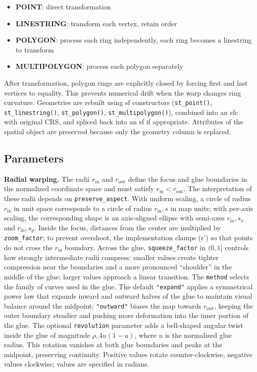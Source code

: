 \begin{itemize}
\tightlist
\item
  \textbf{POINT}: direct transformation
\item
  \textbf{LINESTRING}: transform each vertex, retain order
\item
  \textbf{POLYGON}: process each ring independently, each ring becomes a linestring to transform
\item
  \textbf{MULTIPOLYGON}: process each polygon separately
\end{itemize}

After transformation, polygon rings are explicitly closed by forcing first and last vertices to equality. This prevents numerical drift when the warp changes ring curvature. Geometries are rebuilt using sf constructors (\texttt{st\_point()}, \texttt{st\_linestring()}, \texttt{st\_polygon()}, \texttt{st\_multipolygon()}), combined into an sfc with original CRS, and spliced back into an sf if appropriate. Attributes of the spatial object are preserved because only the geometry column is replaced.

\subsection{Parameters}\label{parameters}

\textbf{Radial warping.} The radii \(r_{\text{in}}\) and \(r_{\text{out}}\) define the focus and glue boundaries in the normalized coordinate space and must satisfy \(r_{\text{in}} < r_{\text{out}}\). The interpretation of these radii depends on \texttt{preserve\_aspect}. With uniform scaling, a circle of radius \(r_{\text{in}}\) in unit space corresponds to a circle of radius \(r_{\text{in}},s\) in map units; with per-axis scaling, the corresponding shape is an axis-aligned ellipse with semi-axes \(r_{\text{in}},s_x\) and \(r_{\text{in}},s_y\). Inside the focus, distances from the center are multiplied by \texttt{zoom\_factor}; to prevent overshoot, the implementation clamps (r') so that points do not cross the \(r_{\text{in}}\) boundary. Across the glue, \texttt{squeeze\_factor} in \((0,1]\) controls how strongly intermediate radii compress: smaller values create tighter compression near the boundaries and a more pronounced ``shoulder'' in the middle of the glue; larger values approach a linear transition. The \texttt{method} selects the family of curves used in the glue. The default \texttt{"expand"} applies a symmetrical power law that expands inward and outward halves of the glue to maintain visual balance around the midpoint; \texttt{"outward"} biases the map towards \(r_{\text{out}}\), keeping the outer boundary steadier and pushing more deformation into the inner portion of the glue. The optional \texttt{revolution} parameter adds a bell-shaped angular twist inside the glue of magnitude \(\rho,4u(1-u)\), where \(u\) is the normalized glue radius. This rotation vanishes at both glue boundaries and peaks at the midpoint, preserving continuity. Positive values rotate counter-clockwise, negative values clockwise; values are specified in radians.

